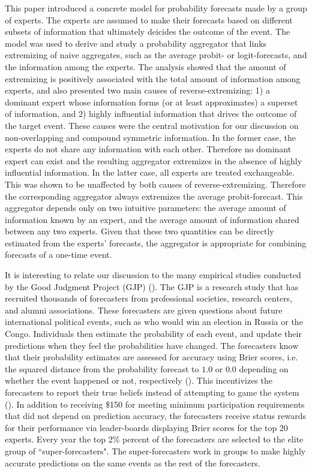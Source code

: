 \documentclass[11pt]{article}
\theoremstyle{definition}
\theoremstyle{definition}
\begin{document}
This paper introduced a concrete model for probability forecasts made by a group of experts. The experts are assumed to make their forecasts based on different subsets of information that ultimately deicides the outcome of the event. The model was used to derive and study a probability aggregator that links extremizing of naive aggregates, such as the average probit- or logit-forecasts, and the information among the experts. The analysis showed that the amount of extremizing is positively associated with the total amount of information among experts, and also presented two main causes of reverse-extremizing: 1) a dominant expert whose information forms (or at least approximates) a superset of information, and 2) highly influential information that drives the outcome of the target event. These causes were the central motivation for our discussion on non-overlapping and compound symmetric information. In the former case, the experts do not share any information with each other. Therefore no dominant expert can exist and the resulting aggregator extremizes in the absence of highly influential information. In the latter case, all experts are treated exchangeable.  This was shown to be unaffected by both causes of reverse-extremizing. Therefore the corresponding aggregator always extremizes the average probit-forecast. This aggregator depends only on two intuitive parameters: the average amount of information known by an expert, and the average amount of information shared between any two experts. Given that these two quantities can be directly estimated from the experts' forecasts, the aggregator is appropriate for combining forecasts of a one-time event. 

It is interesting to relate our discussion to the many empirical studies conducted by the Good Judgment Project (GJP) (\cite{mellers2014psychological, ungar2012good}). The GJP is a research study that has recruited thousands of forecasters from professional societies, research centers, and alumni associations. These forecasters are given questions about future international political events, such as who would win an election in Russia or the Congo. Individuals then estimate the probability of each event, and update their predictions when they feel the probabilities have changed. The forecasters know that their probability estimates are assessed for accuracy using Brier scores, i.e. the squared distance from the  probability forecast to $1.0$ or $0.0$ depending on whether the event happened or not, respectively (\cite{Brier}). This incentivizes the forecasters to report their true beliefs instead of attempting to game the system (\citet{winkler1968good}). In addition to receiving \$150 for meeting minimum participation requirements that did not depend on prediction accuracy, the forecasters receive status rewards for their performance via leader-boards displaying Brier scores for the top 20 experts. Every year the top 2\% percent of the forecasters are selected to the elite group of ``super-forecasters". The super-forecasters work in groups to make highly accurate predictions on the same events as the rest of the forecasters. 
\end{document}
